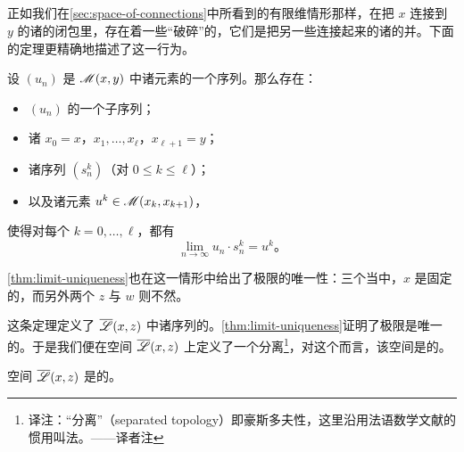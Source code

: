 \subsection{\trBrokenTrajectory}
\label{subsec:broken-trajectories}

正如我们在\cref{sec:space-of-connections}中所看到的有限维情形那样，在把\trCriticalPoint{} $x$ 连接到\trCriticalPoint{} $y$ 的诸\trTrajectory{}的闭包里，存在着一些“破碎”的\trTrajectory，它们是把另一些\trCriticalPoint{}连接起来的诸\trTrajectory{}的并。下面的定理更精确地描述了这一行为。

\begin{theorem}\label{thm:broken-limit-decomposition}
设 $(u_{n})$ 是 $\mathscr{M}(x,y)$ 中诸元素的一个序列。那么存在：
\begin{itemize}
\item $(u_{n})$ 的一个子序列；
\item 诸\trCriticalPoint{} $x_{0}=x$，$x_{1},\dots,x_{\ell}$，$x_{\ell+1}=y$；
\item 诸序列 $(s_{n}^{k})$（对 $0\le k\le\ell$）；
\item 以及诸元素 $u^{k}\in\mathscr{M}(x_{k},x_{k+1})$，
\end{itemize}
使得对每个 $k=0,\dots,\ell$，都有
\[
\lim_{n\to\infty}u_{n}\cdot s_{n}^{k}=u^{k}\text{。}
\]
\end{theorem}

\begin{remark}\label{thm:limit-uniqueness-broken}
\cref{thm:limit-uniqueness}也在这一情形中给出了极限的唯一性：三个\trCriticalPoint{}当中，$x$ 是固定的，而另外两个 $z$ 与 $w$ 则不然。
\end{remark}

这条定理定义了 $\overline{\mathscr{L}}(x,z)$ 中诸序列的\trConvergence。\cref{thm:limit-uniqueness}证明了极限是唯一的。于是我们便在空间 $\overline{\mathscr{L}}(x,z)$ 上定义了一个分离\trTopology\footnote{译注：“分离\trTopology”（separated topology）即豪斯多夫性，这里沿用法语数学文献的惯用叫法。——译者注}，对这个\trTopology{}而言，该空间是\trCompact{}的。

\begin{corollary}\label{thm:broken-l-compact}
空间 $\overline{\mathscr{L}}(x,z)$ 是\trCompact{}的。
\end{corollary}

